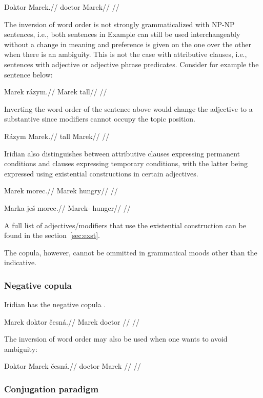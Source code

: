 \a
\begingl
\gla Doktor Marek.//
\glb doctor Marek//
\glft {}//
\endgl

\xe

The inversion of word order is not strongly grammaticalized with NP-NP sentences, i.e., both sentences in Example  can still be used interchangeably without a change in meaning and preference is given on the one over the other when there is an ambiguity. This is not the case with attributive clauses, i.e., sentences with adjective or adjective phrase predicates. Consider for example the sentence below:

\pex
\begingl
\gla Marek rázym.//
\glb Marek tall//
\glft {}//
\endgl
\xe

Inverting the word order of the sentence above would change the adjective to a substantive since modifiers cannot occupy the topic position.

\pex
\begingl
\gla Rázym Marek.//
\glb tall Marek//
\glft {}//
\endgl
\xe

Iridian also distinguishes between attributive clauses expressing permanent conditions and clauses expressing temporary conditions, with the latter being expressed using existential constructions in certain adjectives.

\pex
\begingl
\gla *Marek morec.//
\glb Marek hungry//
\glft {}//
\endgl
\xe


\pex
\begingl
\gla Marka ješ morec.//
\glb Marek-\Acc{} \Exst{} hunger//
\glft {}//
\endgl
\xe

A full list of adjectives/modifiers that use the existential construction can be found in the section~\ref{sec:exst}.

The copula, however, cannot be ommitted in grammatical moods other than the indicative.

\subsubsection{Negative copula}

Iridian has the negative copula .

\pex
\begingl
\gla Marek doktor česná.//
\glb Marek doctor //
\glft {}//
\endgl
\xe

\par The inversion of word order may also be used when one wants to avoid ambiguity:

\pex
\begingl
\gla Doktor Marek česná.//
\glb doctor Marek //
\glft {}//
\endgl
\xe


\subsubsection{Conjugation paradigm}
